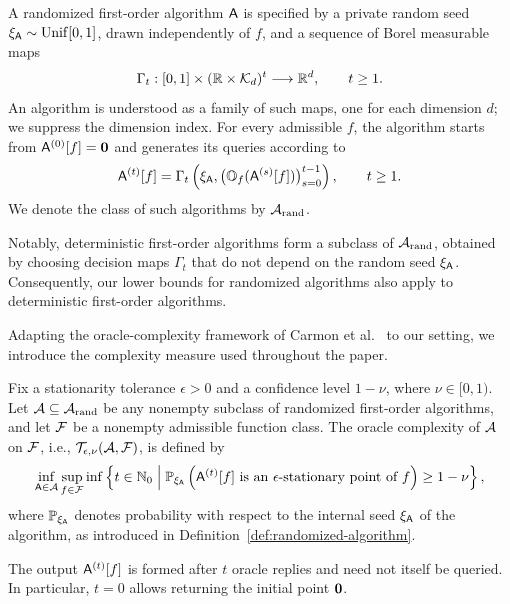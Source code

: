 \begin{definition}
\label{def:randomized-algorithm}
A randomized first-order algorithm ${\mathsf{A}}$ is specified by
a private random seed
$\xi_{{\mathsf{A}}}\sim\operatorname{Unif}[0,1]$, drawn independently
of $f$, and a sequence of Borel measurable maps
\[
\Gamma_t:
[0,1]\times({\mathbb{R}}\times\mathcal K_d)^t
\longrightarrow {\mathbb{R}}^d,
\qquad t\geq1.
\]
An algorithm is understood as a family of such maps,
one for each dimension $d$; we suppress the dimension index.
For every admissible $f$, the algorithm starts from
${\mathsf{A}}^{(0)}[f]={\mathbf 0}$ and generates its queries according to
\[
{\mathsf{A}}^{(t)}[f]
=
\Gamma_t\left(
    \xi_{{\mathsf{A}}},
    \bigl(
        \mathbb O_f({\mathsf{A}}^{(s)}[f])
    \bigr)_{s=0}^{t-1}
\right),
\qquad t\geq1.
\]
We denote the class of such algorithms by
$\mathcal A_{\operatorname{rand}}$.
\end{definition}
Notably, deterministic first-order algorithms form a subclass of
$\mathcal A_{\operatorname{rand}}$, obtained by choosing decision maps
$\Gamma_t$ that do not depend on the random seed $\xi_{{\mathsf{A}}}$.
Consequently, our lower bounds for randomized algorithms
also apply to deterministic first-order algorithms.

Adapting the oracle-complexity framework of
Carmon et al.~\citep{CarmonEtAl2021} to our setting,
we introduce the complexity measure used throughout the paper. 
\begin{definition}
\label{def:complexity-algorithm-class}
Fix a stationarity tolerance \(\epsilon>0\) and a confidence level
\(1-\nu\), where \(\nu\in[0,1)\). Let
\({\cal A}\subseteq{\cal A}_{\operatorname{rand}}\) be any nonempty subclass of randomized
first-order algorithms, and let \({\cal F}\) be a nonempty admissible
function class. The oracle complexity of \({\cal A}\) on \({\cal F}\), i.e., ${\cal T}_{\epsilon,\nu}({\cal A},{\cal F})$, is
defined by
\[
    {\color{black}\inf_{{\mathsf{A}}\in{\cal A}}
    \sup_{f\in{\cal F}}
    \inf}
    \left\{
        t\in{\mathbb{N}}_0
        \;\middle|\;
        {\mathbb{P}}_{\xi_{{\mathsf{A}}}}
        \left(
            {\mathsf{A}}^{(t)}[f]
            \text{ is an }\epsilon\text{-stationary point of }f
        \right)
        \geq 1-\nu
    \right\},
\]
where \({\mathbb{P}}_{\xi_{{\mathsf{A}}}}\) denotes probability with respect to the
internal seed \(\xi_{{\mathsf{A}}}\) of the algorithm, as introduced in
Definition~\ref{def:randomized-algorithm}.
\end{definition}
The output ${\mathsf{A}}^{(t)}[f]$ is formed after $t$ oracle replies
and need not itself be queried. In particular, $t=0$
allows returning the initial point ${\mathbf 0}$. 
